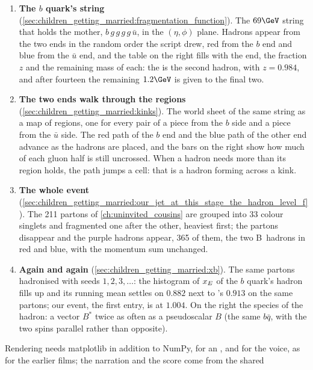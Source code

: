 \begin{enumerate}
    becomes one of the seven hadrons. On the right the same vertices are
    drawn in light-cone coordinates, where the area law places them near a
    hyperbola $\Gamma=x^+x^-$ of a few GeV$^2$.
  \item \textbf{The $b$ quark's string} (\cref{sec:children_getting_married:fragmentation_function}).
    The $69\GeV$ string that holds the mother, $b\,g\,g\,g\,g\,\bar u$, in
    the $(\eta,\phi)$ plane. Hadrons appear from the two ends in the random
    order the script drew, red from the $b$ end and blue from the $\bar u$
    end, and the table on the right fills with the end, the fraction $z$
    and the remaining mass of each: the \Bstarbar is the second hadron,
    with $z=0.984$, and after fourteen the remaining $1.2\GeV$ is given to
    the final two.
  \item \textbf{The two ends walk through the regions} (\cref{sec:children_getting_married:kinks}).
    The world sheet of the same string as a map of regions, one for every
    pair of a piece from the $b$ side and a piece from the $\bar u$ side.
    The red path of the $b$ end and the blue path of the other end advance
    as the hadrons are placed, and the bars on the right show how much of
    each gluon half is still uncrossed. When a hadron needs more than its
    region holds, the path jumps a cell: that is a hadron forming across a
    kink.
  \item \textbf{The whole event} (\cref{sec:children_getting_married:our_jet_at_this_stage_the_hadron_level_f}).
    The 211 partons of \cref{ch:uninvited_cousins} are grouped into 33
    colour singlets and fragmented one after the other, heaviest first; the
    partons disappear and the purple hadrons appear, 365 of them, the two
    B~hadrons in red and blue, with the momentum sum unchanged.
  \item \textbf{Again and again} (\cref{sec:children_getting_married:xb}).
    The same partons hadronised with seeds $1,2,3,\ldots$: the histogram of
    $x_E$ of the $b$ quark's hadron fills up and its running mean settles
    on $0.882$ next to \PYTHIA's $0.913$ on the same partons; our event,
    the first entry, is at $1.004$. On the right the species of the
    hadron: a vector $B^*$ twice as often as a pseudoscalar $B$ (the same
    $b\bar q$, with the two spins parallel rather than opposite).
\end{enumerate}
Rendering needs matplotlib in addition to NumPy,  for an
, and  for the voice, as for the earlier films;
the narration and the score come from the shared
